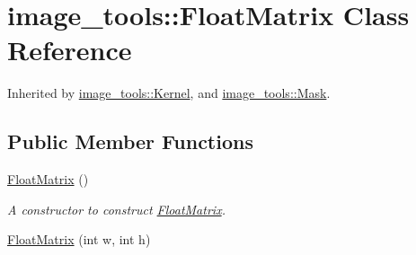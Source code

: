 \hypertarget{classimage__tools_1_1FloatMatrix}{}\section{image\+\_\+tools\+:\+:Float\+Matrix Class Reference}
\label{classimage__tools_1_1FloatMatrix}


Inherited by \hyperlink{classimage__tools_1_1Kernel}{image\+\_\+tools\+::\+Kernel}, and \hyperlink{classimage__tools_1_1Mask}{image\+\_\+tools\+::\+Mask}.

\subsection*{Public Member Functions}
\begin{DoxyCompactItemize}
\item 
\hyperlink{classimage__tools_1_1FloatMatrix_a8d7d1e54d9234af0628af1e291b3196e}{Float\+Matrix} ()\hypertarget{classimage__tools_1_1FloatMatrix_a8d7d1e54d9234af0628af1e291b3196e}{}\label{classimage__tools_1_1FloatMatrix_a8d7d1e54d9234af0628af1e291b3196e}

\begin{DoxyCompactList}\small\item\em A constructor to construct \hyperlink{classimage__tools_1_1FloatMatrix}{Float\+Matrix}. \end{DoxyCompactList}\item 
\hyperlink{classimage__tools_1_1FloatMatrix_a98708d33731113bdd36d59698ff77418}{Float\+Matrix} (int w, int h)\hypertarget{classimage__tools_1_1FloatMatrix_a98708d33731113bdd36d59698ff77418}{}\label{classimage__tools_1_1FloatMatrix_a98708d33731113bdd36d59698ff77418}


\end{DoxyCompactItemize}
